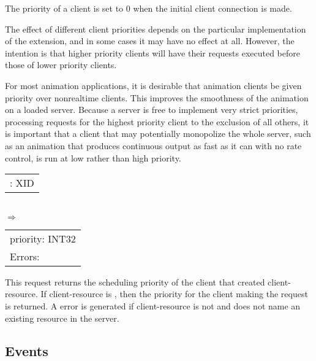\begin{description}
The priority of a client is set to 0 when the initial client connection is
made.

The effect of different client priorities depends on the particular
implementation of the extension, and in some cases it may have no effect at
all. However, the intention is that higher priority clients will have their
requests executed before those of lower priority clients.

For most animation applications, it is desirable that animation clients be
given priority over nonrealtime clients. This improves the smoothness of the
animation on a loaded server. Because a server is free to implement very strict
priorities, processing requests for the highest priority client to the
exclusion of all others, it is important that a client that may potentially
monopolize the whole server, such as an animation that produces continuous
output as fast as it can with no rate control, is run at low rather than high
priority.


\begin{tabular}{l}
	\param{client-resource}: XID\\
\end{tabular}\\
$\Rightarrow$\\
\begin{tabular}{l}
	priority: INT32\\[5pt]
	Errors: \error{Match}
\end{tabular}

This request returns the scheduling priority of the client that created
client-resource. If client-resource is , then the
priority for the client making the request is returned. A  error
is generated if client-resource is not  and does not name
an existing resource in the server.

\end{description}

\subsection{Events}

